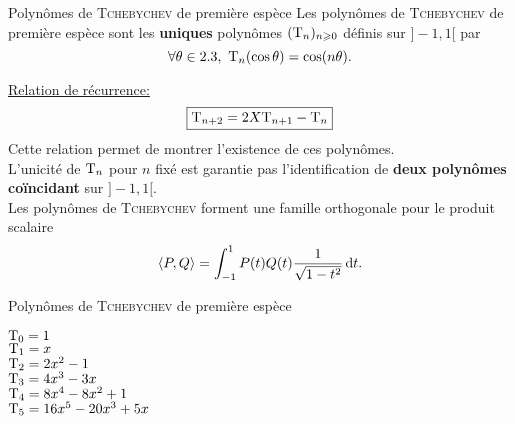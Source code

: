 \begin{box_titre}{Polynômes de \textsc{Tchebychev} de première espèce}
    Les polynômes de \textsc{Tchebychev} de première espèce sont les \textbf{uniques} polynômes $(\mathrm{T}_n)_{n \geqslant 0}$ définis sur $]-1, 1[$ par
    $$\forall \theta \in 2.3,\ \mathrm{T}_n (\cos \theta) = \cos(n \theta).$$
\end{box_titre}

\underline{Relation de récurrence:}
$$\boxed{\mathrm{T}_{n+2} = 2X \mathrm{T}_{n+1} - \mathrm{T}_n}$$
Cette relation permet de montrer l'existence de ces polynômes. \\
L'unicité de $\mathrm{T}_n$ pour $n$ fixé est garantie pas l'identification de \textbf{deux polynômes coïncidant} sur $]-1, 1[$. \\
Les polynômes de \textsc{Tchebychev} forment une famille orthogonale pour le produit scalaire
$$\langle P, Q \rangle = \int_{-1}^{1} P(t) Q(t) \frac{1}{\sqrt{1-t^2}} \, \mathrm{d} t.$$

\begin{marginfigure}[-8.5cm]
	
	\caption{Polynômes de \textsc{Tchebychev} de première espèce}
	\begin{flushright}
	{\scriptsize
	\color{blue} $\mathrm{T}_0 = 1$ \\ 
	\color{red} $\mathrm{T}_1 = x$ \\
	\color{green} $\mathrm{T}_2 = 2x^2-1$ \\
	\color{purple} $\mathrm{T}_3 = 4x^3-3x$ \\
	\color{black} $\mathrm{T}_4 = 8x^4-8x^2+1$ \\
	\color{orange} $\mathrm{T}_5 = 16x^5-20x^3+5x$
	}
	\end{flushright}
\end{marginfigure}
